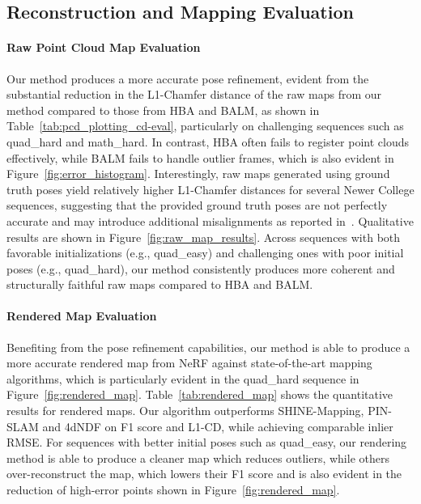 \subsection{Reconstruction and Mapping Evaluation}\label{sec:pcd_plot_map}
\paragraph{Raw Point Cloud Map Evaluation}
Our method produces a more accurate pose refinement, evident from the substantial reduction in the L1-Chamfer distance of the raw maps from our method compared to those from HBA and BALM, as shown in Table~\ref{tab:pcd_plotting_cd-eval}, particularly on challenging sequences such as quad\_hard and math\_hard. In contrast, HBA often fails to register point clouds effectively, while BALM fails to handle outlier frames, which is also evident in Figure~\ref{fig:error_histogram}. Interestingly, raw maps generated using ground truth poses yield relatively higher L1-Chamfer distances for several Newer College sequences, suggesting that the provided ground truth poses are not perfectly accurate and may introduce additional misalignments as reported in~\cite{zhong20244dNDF}. Qualitative results are shown in Figure~\ref{fig:raw_map_results}. Across sequences with both favorable initializations (e.g., quad\_easy) and challenging ones with poor initial poses (e.g., quad\_hard), our method consistently produces more coherent and structurally faithful raw maps compared to HBA and BALM.


\paragraph{Rendered Map Evaluation}
Benefiting from the pose refinement capabilities, our method is able to produce a more accurate rendered map from NeRF against state-of-the-art mapping algorithms, which is particularly evident in the quad\_hard sequence in Figure~\ref{fig:rendered_map}. Table~\ref{tab:rendered_map} shows the quantitative results for rendered maps. Our algorithm outperforms SHINE-Mapping, PIN-SLAM and 4dNDF on F1 score and L1-CD, while achieving comparable inlier RMSE. For sequences with better initial poses such as quad\_easy, our rendering method is able to produce a cleaner map which reduces outliers, while others over-reconstruct the map, which lowers their F1 score and is also evident in the reduction of high-error points shown in Figure~\ref{fig:rendered_map}.

